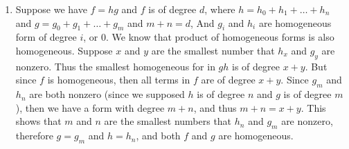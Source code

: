 \begin{enumerate}[label=]
    \item 
        Suppose we have $f = hg$ and $f$ is of degree $d$, where $h = h_0 + h_1 + \dots + h_n$ and $g = g_0 + g_1 + \dots + g_m$ and $m + n = d$, And $g_i$ and $h_i$ are homogeneous form of degree $i$, or 0.
        We know that product of homogeneous forms is also homogeneous. Suppose $x$ and $y$ are the smallest number that $h_x$ and $g_y$ are nonzero. Thus the smallest homogeneous for in $gh$ is of degree $x + y$. But since $f$ is homogeneous, then all terms in $f$ are of degree $x + y$. Since $g_m$ and $h_n$ are both nonzero (since we supposed $h$ is of degree $n$ and $g$ is of degree $m$), then we have a form with degree $m + n$, and thus $m + n = x + y$. This shows that $m$ and $n$ are the smallest numbers that $h_n$ and $g_m$ are nonzero, therefore $g = g_m$ and $h = h_n$, and both $f$ and $g$ are homogeneous.
\end{enumerate} 